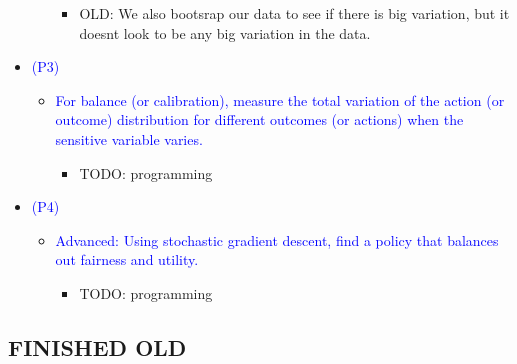 \begin{itemize}
\begin{itemize}
\begin{itemize}
                \item OLD: We also bootsrap our data to see if there is big variation, but it doesnt look to be any big variation in the data.
            \end{itemize}
        \end{itemize}
    \item \textcolor{blue}{(P3)}
        \begin{itemize}
            \item \textcolor{blue}{For balance (or calibration), measure the total variation of the action (or outcome) distribution for different outcomes (or actions) when the sensitive variable varies.}
            \begin{itemize}
                \item TODO: programming
            \end{itemize}
        \end{itemize}
    \item \textcolor{blue}{(P4)}
        \begin{itemize}
            \item \textcolor{blue}{Advanced: Using stochastic gradient descent, find a policy that balances out fairness and utility.}
            \begin{itemize}
                \item TODO: programming
            \end{itemize}
        \end{itemize}
\end{itemize}

\subsection*{FINISHED OLD}
